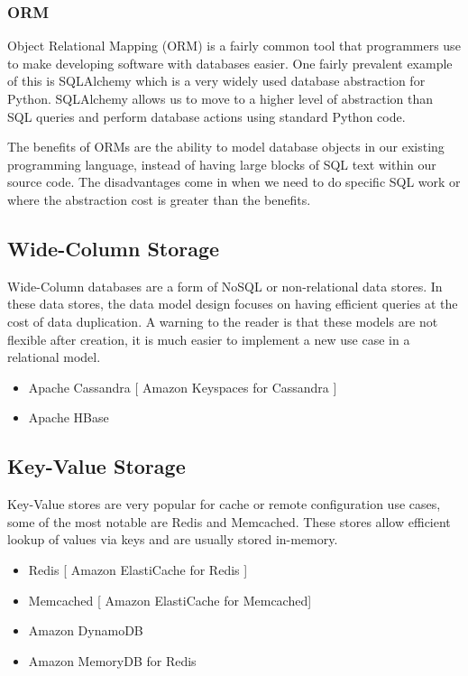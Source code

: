 \documentclass{csse4400}
\begin{document}
\subsubsection{ORM}
Object Relational Mapping (ORM) is a fairly common tool that programmers use to make developing software with databases easier.
One fairly prevalent example of this is SQLAlchemy which is a very widely used database abstraction for Python.
SQLAlchemy allows us to move to a higher level of abstraction than SQL queries and perform database actions using standard Python code.

The benefits of ORMs are the ability to model database objects in our existing programming language,
instead of having large blocks of SQL text within our source code.
The disadvantages come in when we need to do specific SQL work or where the abstraction cost is greater than the benefits.

\subsection{Wide-Column Storage}


Wide-Column databases are a form of NoSQL or non-relational data stores.
In these data stores, the data model design focuses on having efficient queries at the cost of data duplication.
A warning to the reader is that these models are not flexible after creation,
it is much easier to implement a new use case in a relational model.

\begin{itemize}
  \item Apache Cassandra [ Amazon Keyspaces for Cassandra ]
  \item Apache HBase
\end{itemize}

\subsection{Key-Value Storage}

Key-Value stores are very popular for cache or remote configuration use cases,
some of the most notable are Redis and Memcached.
These stores allow efficient lookup of values via keys and are usually stored in-memory.

\begin{itemize}
  \item Redis [ Amazon ElastiCache for Redis ]
  \item Memcached [ Amazon ElastiCache for Memcached]
  \item Amazon DynamoDB
  \item Amazon MemoryDB for Redis
\end{itemize}
\end{document}
